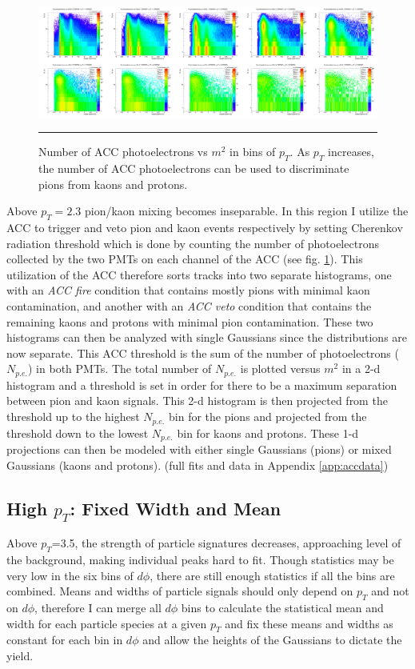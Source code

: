 \begin{figure}
  \centering
    \includegraphics[width=1.1\textwidth]{hiptfits/nphotvsm2.jpg}
    \rule{35em}{0.5pt}
  \caption[Number of ACC photoelectrons vs $m^2$ in bins of $p_T$.]{Number of ACC photoelectrons vs $m^2$ in bins of $p_T$. As $p_T$ increases, the number of ACC photoelectrons can be used to discriminate pions from kaons and protons.}
  \label{fig:accspread}
\end{figure}

Above $p_T=2.3$ pion/kaon mixing becomes inseparable. In this region I utilize the ACC to trigger and veto pion and kaon events respectively by setting Cherenkov radiation threshold which is done by counting the number of photoelectrons collected by the two PMTs on each channel of the ACC (see fig. \ref{fig:accspread}). This utilization of the ACC therefore sorts tracks into two separate histograms, one with an \textit{ACC fire} condition that contains mostly pions with minimal kaon contamination, and another with an \textit{ACC veto} condition that contains the remaining kaons and protons with minimal pion contamination. These two histograms can then be analyzed with single Gaussians since the distributions are now separate. This ACC threshold is the sum of the number of photoelectrons ($N_{p.e.}$) in both PMTs. The total number of $N_{p.e.}$ is plotted versus $m^2$ in a 2-d histogram and a threshold is set in order for there to be a maximum separation between pion and kaon signals. This 2-d histogram is then projected from the threshold up to the highest $N_{p.e.}$ bin for the pions and projected from the threshold down to the lowest $N_{p.e.}$ bin for kaons and protons. These 1-d projections can then be modeled with either single Gaussians (pions) or mixed Gaussians (kaons and protons). (full fits and data in Appendix \ref{app:accdata})

\subsection{High $p_T$: Fixed Width and Mean}
Above $p_T$=3.5, the strength of particle signatures decreases, approaching level of the background, making individual peaks hard to fit. Though statistics may be very low in the six bins of $d\phi$, there are still enough statistics if all the bins are combined. Means and widths of particle signals should only depend on $p_T$ and not on $d\phi$, therefore I can merge all $d\phi$ bins to calculate the statistical mean and width for each particle species at a given $p_T$ and fix these means and widths as constant for each bin in $d\phi$ and allow the heights of the Gaussians to dictate the yield.

